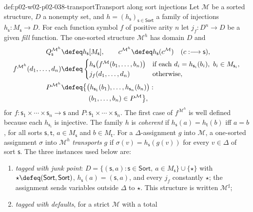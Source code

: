 \begin{hbdefinition}{def:p02-w02-p02-038-transport}{Transport along sort injections}
Let \(\mathcal M\) be a sorted structure, \(D\) a nonempty set, and
\(h=(h_{\mathsf s})_{\mathsf s\in\mathsf{Sort}}\) a family of injections
\(h_{\mathsf s}:M_{\mathsf s}\to D\).  For each function symbol \(f\) of
positive arity \(n\) let \(j_f:D^n\to D\) be a given \emph{fill} function.
The one-sorted structure \(\mathcal M^{h}\) has domain \(D\) and
\[
\begin{aligned}
 Q_{\mathsf s}^{\mathcal M^{h}}&\defeq h_{\mathsf s}[M_{\mathsf s}],\qquad
 c^{\mathcal M^{h}}\defeq h_{\mathsf s}(c^{\mathcal M})\quad(c:\longrightarrow\mathsf s),\\
 f^{\mathcal M^{h}}(d_1,\ldots,d_n)&\defeq
 \begin{cases}
 h_{\mathsf s}\bigl(f^{\mathcal M}(b_1,\ldots,b_n)\bigr)
   & \text{if each }d_i=h_{\mathsf s_i}(b_i),\ b_i\in M_{\mathsf s_i},\\
 j_f(d_1,\ldots,d_n) & \text{otherwise},
 \end{cases}\\
 P^{\mathcal M^{h}}&\defeq\bigl\{\bigl(h_{\mathsf s_1}(b_1),\ldots,
   h_{\mathsf s_n}(b_n)\bigr):\\
 &\qquad\qquad(b_1,\ldots,b_n)\in P^{\mathcal M}\bigr\},
\end{aligned}
\]
for \(f:\mathsf s_1\times\cdots\times\mathsf s_n\longrightarrow\mathsf s\)
and \(P:\mathsf s_1\times\cdots\times\mathsf s_n\).  The first case of
\(f^{\mathcal M^{h}}\) is well defined because each \(h_{\mathsf s_i}\) is
injective.  The family \(h\) is \emph{coherent} if
\(h_{\mathsf s}(a)=h_{\mathsf t}(b)\) iff \(a=b\), for all sorts
\(\mathsf s,\mathsf t\), \(a\in M_{\mathsf s}\) and \(b\in M_{\mathsf t}\).
For a \(\Delta\)-assignment \(g\) into \(\mathcal M\), a one-sorted assignment
\(\sigma\) into \(\mathcal M^{h}\) \emph{transports} \(g\) if
\(\sigma(v)=h_{\mathsf s}(g(v))\) for every \(v\in\Delta\) of sort
\(\mathsf s\).  The three instances used below are:
\begin{enumerate}
\item \emph{tagged with junk point}: \(D=\{(\mathsf s,a):\mathsf s\in
      \mathsf{Sort},\ a\in M_{\mathsf s}\}\cup\{\star\}\) with
      \(\star\defeq(\mathsf{Sort},\mathsf{Sort})\),
      \(h_{\mathsf s}(a)=(\mathsf s,a)\), and every \(j_f\) constantly
      \(\star\); the assignment sends variables outside \(\Delta\) to
      \(\star\).  This structure is written \(\mathcal M^{\sharp}\);
\item \emph{tagged with defaults}, for a strict \(\mathcal M\) with a total

\end{enumerate}
\end{hbdefinition}
